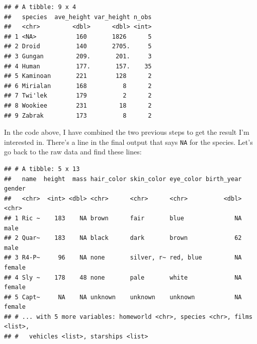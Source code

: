 \documentclass[]{gitbook}
\newenvironment{Shaded}{\begin{snugshade}}{\end{snugshade}}
\newcommand{\DataTypeTok}[1]{\textcolor[rgb]{0.13,0.29,0.53}{#1}}
\newcommand{\DecValTok}[1]{\textcolor[rgb]{0.00,0.00,0.81}{#1}}
\newcommand{\KeywordTok}[1]{\textcolor[rgb]{0.13,0.29,0.53}{\textbf{#1}}}
\newcommand{\NormalTok}[1]{#1}
\newcommand{\OperatorTok}[1]{\textcolor[rgb]{0.81,0.36,0.00}{\textbf{#1}}}
\newcommand{\OtherTok}[1]{\textcolor[rgb]{0.56,0.35,0.01}{#1}}
\newcommand{\StringTok}[1]{\textcolor[rgb]{0.31,0.60,0.02}{#1}}
\begin{document}
\begin{Shaded}
\end{Shaded}

\begin{verbatim}
## # A tibble: 9 x 4
##   species  ave_height var_height n_obs
##   <chr>         <dbl>      <dbl> <int>
## 1 <NA>           160       1826      5
## 2 Droid          140       2705.     5
## 3 Gungan         209.       201.     3
## 4 Human          177.       157.    35
## 5 Kaminoan       221        128      2
## 6 Mirialan       168          8      2
## 7 Twi'lek        179          2      2
## 8 Wookiee        231         18      2
## 9 Zabrak         173          8      2
\end{verbatim}

In the code above, I have combined the two previous steps to get the result I'm interested in. There's
a line in the final output that says \texttt{NA} for the species. Let's go back to the raw data and find
these lines:

\begin{Shaded}
\end{Shaded}

\begin{verbatim}
## # A tibble: 5 x 13
##   name  height  mass hair_color skin_color eye_color birth_year gender
##   <chr>  <int> <dbl> <chr>      <chr>      <chr>          <dbl> <chr> 
## 1 Ric ~    183    NA brown      fair       blue              NA male  
## 2 Quar~    183    NA black      dark       brown             62 male  
## 3 R4-P~     96    NA none       silver, r~ red, blue         NA female
## 4 Sly ~    178    48 none       pale       white             NA female
## 5 Capt~     NA    NA unknown    unknown    unknown           NA female
## # ... with 5 more variables: homeworld <chr>, species <chr>, films <list>,
## #   vehicles <list>, starships <list>
\end{verbatim}
\end{document}
